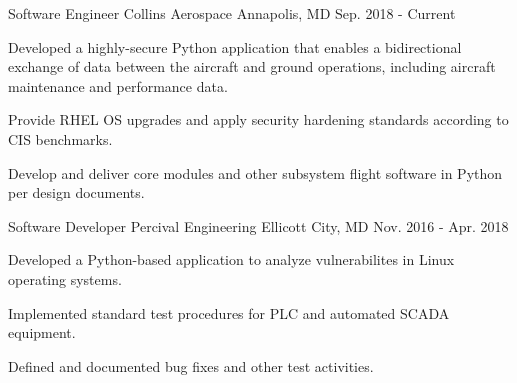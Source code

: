 

\begin{cventries}

  \cventry
    {Software Engineer} %
    {Collins Aerospace} %
    {Annapolis, MD} %
    {Sep. 2018 - Current} %
    {
      \begin{cvitems} %
        \item {Developed a highly-secure Python application that enables a bidirectional exchange of data between the aircraft and ground operations, including aircraft maintenance and performance data.}
        \item {Provide RHEL OS upgrades and apply security hardening standards according to CIS benchmarks.}
        \item {Develop and deliver core modules and other subsystem flight software in Python per design documents.}
      \end{cvitems}
    }

  \cventry
    {Software Developer} %
    {Percival Engineering} %
    {Ellicott City, MD} %
    {Nov. 2016 - Apr. 2018} %
    {
      \begin{cvitems} %
        \item {Developed a Python-based application to analyze vulnerabilites in Linux operating systems.}
        \item {Implemented standard test procedures for PLC and automated SCADA equipment.}
        \item {Defined and documented bug fixes and other test activities.}
      \end{cvitems}
    }


\end{cventries}
